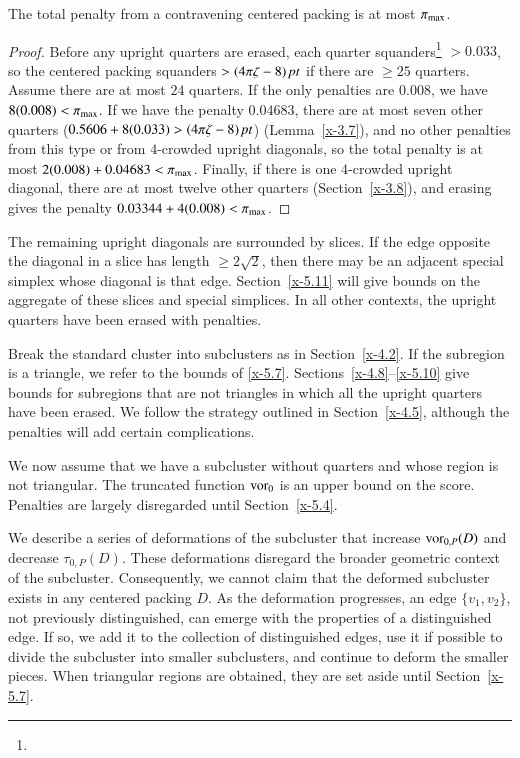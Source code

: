 \begin{lemma}
The total penalty from a contravening centered packing is at most
$\pi_{\max}$.
\end{lemma}

\begin{proof}
Before any upright quarters are erased, each quarter
squanders\footnote{} %
$>0.033$, so the centered packing squanders $>(4\pi\zeta-8)\,\hbox{\it pt}$ if there
are $\ge25$ quarters.  Assume there are at most $24$ quarters. If
the only penalties are $0.008$, we have $8(0.008)<\pi_{\max}$. If we
have the penalty $0.04683$, there are at most seven other quarters
($0.5606+8(0.033)>(4\pi\zeta-8)\,\hbox{\it pt}$) (Lemma~\ref{x-3.7}), and no other
penalties from this type or from $4$-crowded upright diagonals, so
the total penalty is at most $2(0.008)+ 0.04683 < \pi_{\max}$.
Finally, if there is one $4$-crowded upright diagonal, there are
at most twelve other quarters (Section~\ref{x-3.8}), and erasing
gives the penalty $0.03344+4 (0.008)<\pi_{\max}$.
\end{proof}

The remaining upright diagonals are surrounded by slices. If
the edge opposite the diagonal in a slice has length
$\ge2\sqrt2$, then there may be an adjacent special simplex whose
diagonal is that edge.  Section~\ref{x-5.11} will give bounds on the
aggregate of these slices and special simplices.  In all
other contexts, the upright quarters have been erased with penalties.

Break the standard cluster into subclusters as in Section~\ref{x-4.2}.
If the subregion is a triangle, we refer to the bounds of \ref{x-5.7}.
Sections~\ref{x-4.8}--\ref{x-5.10} give bounds for subregions that are
not triangles in which all the upright quarters have been erased. We
follow the strategy outlined in Section~\ref{x-4.5}, although the
penalties will add certain complications.

We now assume that we have a subcluster without quarters and whose
region is not triangular.  The truncated function $\operatorname{vor}_0$ is an
upper bound on the score.  Penalties are largely disregarded until
Section~\ref{x-5.4}.

We describe a series of deformations of the subcluster that
increase $\operatorname{vor}_{0,P}(D)$ and decrease $\tau_{0,P}(D)$.  These
deformations disregard the broader geometric context of the
subcluster. Consequently, we cannot claim that the deformed
subcluster exists in any centered packing $D$.  As the deformation
progresses, an edge $\{v_1,v_2\}$, not previously distinguished,
can emerge with the properties of a distinguished edge. If so, we
add it to the collection of distinguished edges, use it if
possible to divide the subcluster into smaller subclusters, and
continue to deform the smaller pieces.  When triangular regions
are obtained, they are set aside until Section~\ref{x-5.7}.

